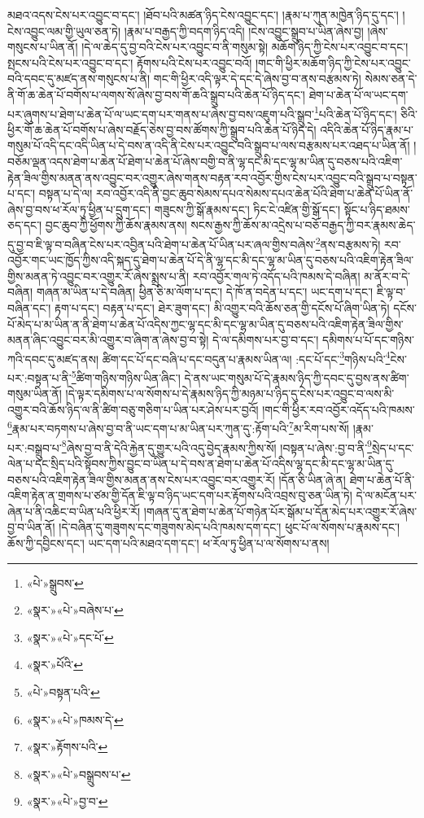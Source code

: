 མཐའ་འདས་ངེས་པར་འབྱུང་བ་དང་། །ཐོབ་པའི་མཚན་ཉིད་ངེས་འབྱུང་དང་། །རྣམ་པ་ཀུན་མཁྱེན་ཉིད་དུ་དང་། །ངེས་འབྱུང་ལམ་གྱི་ཡུལ་ཅན་ཏེ། །རྣམ་པ་བརྒྱད་ཀྱི་བདག་ཉིད་འདི། །ངེས་འབྱུང་སྒྲུབ་པ་ཡིན་ཞེས་བྱ། །ཞེས་གསུངས་པ་ཡིན་ནོ། །དེ་ལ་ཆེད་དུ་བྱ་བའི་ངེས་པར་འབྱུང་བ་ནི་གསུམ་སྟེ། མཆོག་ཉིད་ཀྱི་ངེས་པར་འབྱུང་བ་དང་། སྤངས་པའི་ངེས་པར་འབྱུང་བ་དང་། རྟོགས་པའི་ངེས་པར་འབྱུང་བའོ། །གང་གི་ཕྱིར་མཆོག་ཉིད་ཀྱི་ངེས་པར་འབྱུང་བའི་དབང་དུ་མཛད་ནས་གསུངས་པ་ནི། གང་གི་ཕྱིར་འདི་ལྟར་དེ་དང་དེ་ཞེས་བྱ་བ་ནས་བརྩམས་ཏེ། སེམས་ཅན་དེ་ནི་གོ་ཆ་ཆེན་པོ་བགོས་པ་ལགས་སོ་ཞེས་བྱ་བས་གོ་ཆའི་སྒྲུབ་པའི་ཆེན་པོ་ཉིད་དང་། ཐེག་པ་ཆེན་པོ་ལ་ཡང་དག་པར་ཞུགས་པ་ཐེག་པ་ཆེན་པོ་ལ་ཡང་དག་པར་གནས་པ་ཞེས་བྱ་བས་འཇུག་པའི་སྒྲུབ་\footnote{«པེ་»སྒྲུབས་}པའི་ཆེན་པོ་ཉིད་དང་། ཅིའི་ཕྱིར་གོ་ཆ་ཆེན་པོ་བགོས་པ་ཞེས་བརྗོད་ཅེས་བྱ་བས་ཚོགས་ཀྱི་སྒྲུབ་པའི་ཆེན་པོ་ཉིད་དེ། འདིའི་ཆེན་པོ་ཉིད་རྣམ་པ་གསུམ་པོ་འདི་དང་འདི་ཡིན་པ་དེ་བས་ན་འདི་ནི་ངེས་པར་འབྱུང་བའི་སྒྲུབ་པ་ལས་བརྩམས་པར་འཐད་པ་ཡིན་ནོ། །བཅོམ་ལྡན་འདས་ཐེག་པ་ཆེན་པོ་ཐེག་པ་ཆེན་པོ་ཞེས་བགྱི་བ་ནི་ལྷ་དང་མི་དང་ལྷ་མ་ཡིན་དུ་བཅས་པའི་འཇིག་རྟེན་ཟིལ་གྱིས་མནན་ནས་འབྱུང་བར་འགྱུར་ཞེས་གནས་བརྟན་རབ་འབྱོར་གྱིས་ངེས་པར་འབྱུང་བའི་སྒྲུབ་པ་བསྟན་པ་དང་། བསྟན་པ་དེ་ལ། རབ་འབྱོར་འདི་ནི་བྱང་ཆུབ་སེམས་དཔའ་སེམས་དཔའ་ཆེན་པོའི་ཐེག་པ་ཆེན་པོ་ཡིན་ནོ་ཞེས་བྱ་བས་ཕ་རོལ་ཏུ་ཕྱིན་པ་དྲུག་དང་། གཟུངས་ཀྱི་སྒོ་རྣམས་དང་། ཏིང་ངེ་འཛིན་གྱི་སྒོ་དང་། སྟོང་པ་ཉིད་ཐམས་ཅད་དང་། བྱང་ཆུབ་ཀྱི་ཕྱོགས་ཀྱི་ཆོས་རྣམས་ནས། སངས་རྒྱས་ཀྱི་ཆོས་མ་འདྲེས་པ་བཅོ་བརྒྱད་ཀྱི་བར་རྣམས་ཆེད་དུ་བྱ་བ་ཇི་ལྟ་བ་བཞིན་ངེས་པར་འབྱིན་པའི་ཐེག་པ་ཆེན་པོ་ཡིན་པར་ཞལ་གྱིས་བཞེས་\footnote{«སྣར་»«པེ་»བཞེས་པ་}ནས་བརྩམས་ཏེ། རབ་འབྱོར་གང་ཡང་ཁྱོད་ཀྱིས་འདི་སྐད་དུ་ཐེག་པ་ཆེན་པོ་དེ་ནི་ལྷ་དང་མི་དང་ལྷ་མ་ཡིན་དུ་བཅས་པའི་འཇིག་རྟེན་ཟིལ་གྱིས་མནན་ཏེ་འབྱུང་བར་འགྱུར་རོ་ཞེས་སྨྲས་པ་ནི། རབ་འབྱོར་གལ་ཏེ་འདོད་པའི་ཁམས་དེ་བཞིན། མ་ནོར་བ་དེ་བཞིན། གཞན་མ་ཡིན་པ་དེ་བཞིན། ཕྱིན་ཅི་མ་ལོག་པ་དང་། དེ་ཁོ་ན་བདེན་པ་དང་། ཡང་དག་པ་དང་། ཇི་ལྟ་བ་བཞིན་དང་། རྟག་པ་དང་། བརྟན་པ་དང་། ཐེར་ཟུག་དང་། མི་འགྱུར་བའི་ཆོས་ཅན་གྱི་དངོས་པོ་ཞིག་ཡིན་ཏེ། དངོས་པོ་མེད་པ་མ་ཡིན་ན་ནི་ཐེག་པ་ཆེན་པོ་འདིས་ཀྱང་ལྷ་དང་མི་དང་ལྷ་མ་ཡིན་དུ་བཅས་པའི་འཇིག་རྟེན་ཟིལ་གྱིས་མནན་ཞིང་འབྱུང་བར་མི་འགྱུར་བ་ཞིག་ན་ཞེས་བྱ་བ་སྟེ། དེ་ལ་དམིགས་པར་བྱ་བ་དང་། དམིགས་པ་པོ་དང་གཉིས་ཀའི་དབང་དུ་མཛད་ནས། ཚིག་དང་པོ་དང་བཞི་པ་དང་བདུན་པ་རྣམས་ཡིན་ལ། :དང་པོ་དང་\footnote{«སྣར་»«པེ་»དང་པོ་}གཉིས་པའི་\footnote{«སྣར་»པོའི་}ངེས་པར་:བསྟན་པ་ནི་\footnote{«པེ་»བསྟན་པའི་}ཚིག་གཉིས་གཉིས་ཡིན་ཞིང་། དེ་ནས་ཡང་གསུམ་པོ་དེ་རྣམས་ཉིད་ཀྱི་དབང་དུ་བྱས་ནས་ཚིག་གསུམ་ཡིན་ནོ། །དེ་ལྟར་དམིགས་པ་ལ་སོགས་པ་དེ་རྣམས་ཉིད་ཀྱི་མཉམ་པ་ཉིད་དུ་ངེས་པར་འབྱུང་བ་ལས་མི་འགྱུར་བའི་ཆོས་ཉིད་ལ་ནི་ཚིག་བཅུ་གཅིག་པ་ཡིན་པར་ཤེས་པར་བྱའོ། །གང་གི་ཕྱིར་རབ་འབྱོར་འདོད་པའི་ཁམས་\footnote{«སྣར་»«པེ་»ཁམས་དེ་}རྣམ་པར་བཏགས་པ་ཞེས་བྱ་བ་ནི་ཡང་དག་པ་མ་ཡིན་པར་ཀུན་དུ་:རྟོག་པའི་\footnote{«སྣར་»རྟོགས་པའི་}མ་རིག་པས་སོ། །རྣམ་པར་:བསྒྲུབ་པ་\footnote{«སྣར་»«པེ་»བསྒྲུབས་པ་}ཞེས་བྱ་བ་ནི་དེའི་རྐྱེན་དུ་གྱུར་པའི་འདུ་བྱེད་རྣམས་ཀྱིས་སོ། །བསྟན་པ་ཞེས་:བྱ་བ་ནི་\footnote{«སྣར་»«པེ་»བྱ་བ་}སྲེད་པ་དང་ལེན་པ་དང་སྲིད་པའི་སྟོབས་ཀྱིས་བྱུང་བ་ཡིན་པ་དེ་བས་ན་ཐེག་པ་ཆེན་པོ་འདིས་ལྷ་དང་མི་དང་ལྷ་མ་ཡིན་དུ་བཅས་པའི་འཇིག་རྟེན་ཟིལ་གྱིས་མནན་ནས་ངེས་པར་འབྱུང་བར་འགྱུར་རོ། །དོན་ཅི་ཡིན་ཞེ་ན། ཐེག་པ་ཆེན་པོ་ནི་འཇིག་རྟེན་ན་གྲགས་པ་ཙམ་གྱི་དོན་ཇི་ལྟ་བ་ཉིད་ཡང་དག་པར་རྟོགས་པའི་འབྲས་བུ་ཅན་ཡིན་ཏེ། དེ་ལ་མངོན་པར་ཞེན་པ་ནི་འཆིང་བ་ཡིན་པའི་ཕྱིར་རོ། །གཞན་དུ་ན་ཐེག་པ་ཆེན་པོ་གཉེན་པོར་སྒོམ་པ་དོན་མེད་པར་འགྱུར་རོ་ཞེས་བྱ་བ་ཡིན་ནོ། །དེ་བཞིན་དུ་གཟུགས་དང་གཟུགས་མེད་པའི་ཁམས་དག་དང་། ཕུང་པོ་ལ་སོགས་པ་རྣམས་དང་། ཆོས་ཀྱི་དབྱིངས་དང་། ཡང་དག་པའི་མཐའ་དག་དང་། ཕ་རོལ་ཏུ་ཕྱིན་པ་ལ་སོགས་པ་ནས། 
